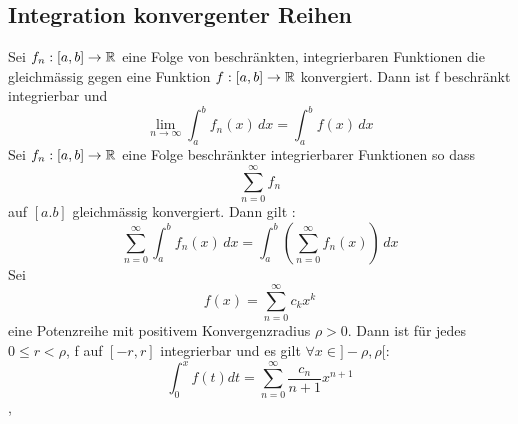 \subsection{Integration konvergenter Reihen}
 Sei \(f_n : [a,b] \rightarrow \mathbb{R} \) eine Folge von beschränkten, integrierbaren Funktionen die gleichmässig gegen eine Funktion \(f:[a,b] \rightarrow \mathbb{R} \) konvergiert. Dann ist f beschränkt integrierbar und
\[ \lim\limits_{n \rightarrow \infty} \int_{a}^{b} f_n(x) \,dx = \int_{a}^{b} f(x) \,dx \]
 Sei \(f_n : [a,b] \rightarrow \mathbb{R}\) eine Folge beschränkter integrierbarer Funktionen so dass
\[ \sum_{n=0}^\infty f_n\]
auf \([a.b]\) gleichmässig konvergiert. Dann gilt :
\[ \sum_{n=0}^\infty \int_{a}^{b} f_n(x) \,dx = \int_{a}^{b} ( \sum_{n=0}^{\infty} f_n(x)) \,dx \]
 Sei
\[ f(x) = \sum_{n=0}^{\infty} c_kx^k\]
eine Potenzreihe mit positivem Konvergenzradius \( \rho > 0\). Dann ist für jedes \( 0 \leq r < \rho\), f auf \([-r,r]\) integrierbar und es gilt \( \forall x \in ] -\rho, \rho[:\)
\[ \int_{0}^{x} f(t) dt = \sum_{n=0}^{\infty} \frac{c_n}{n+1} x^{n+1}\]
\sep
